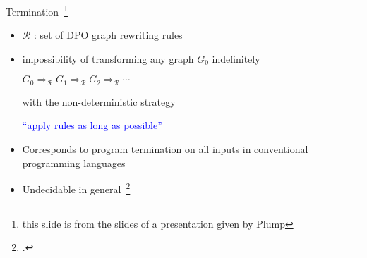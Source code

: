 \documentclass{beamer}
\begin{document}
\begin{frame}{Termination~\footnote{this slide is from the slides of a presentation given by Plump}}
  \begin{itemize}
    \item $\mathcal{R}$ : set of DPO graph rewriting rules
    \item impossibility of transforming any graph $G_0$ indefinitely
      \begin{center}
        $G_0 \mathop{\Rightarrow}_\mathcal{R} G_1 \mathop{\Rightarrow}_\mathcal{R} G_2 \mathop{\Rightarrow}_\mathcal{R} \cdots$
      \end{center}
      with the non-deterministic strategy
          \begin{center}
              \textcolor{blue}{\enquote{apply rules as long as possible}}
          \end{center}
    \item Corresponds to program termination on all inputs in conventional programming languages
          
    \item Undecidable in general~\footcite{plump1998terminationundecidable}

  \end{itemize}
\end{frame}
\end{document}
